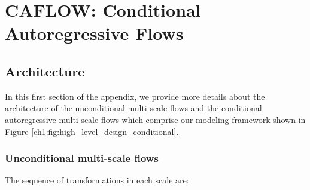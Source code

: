 
\chapter{CAFLOW: Conditional Autoregressive Flows}  %
\section{Architecture}

In this first section of the appendix, we provide more details about the architecture of the unconditional multi-scale flows and the conditional autoregressive multi-scale flows which comprise our modeling framework shown in Figure \ref{ch1:fig:high_level_design_conditional}.

\subsection{Unconditional multi-scale flows}\label{ch1:unconditional-architecture}
The sequence of transformations in each scale are:

